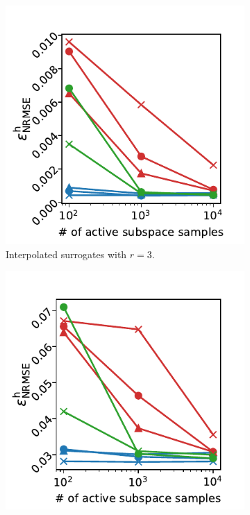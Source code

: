\documentclass[
  a4paper,  %
  twoside,  %
  bibliography=totoc,
  headsepline,
  cleardoublepage=empty,
  parskip=half,
  draft=false
]{scrbook}
\begin{document}
\newpage
\begin{mdframed}[style=style]
\begin{figure}[H]
\begin{subfigure}{.5\textwidth}
  \centering
   \includegraphics[width=\linewidth]{graphics/ishigami_as_3_inter}
	\caption{Interpolated surrogates with $r=3$.}
	\label{fig:ishigami_as_3_inter}
\end{subfigure}
\begin{subfigure}{.5\textwidth}
  \centering
   \includegraphics[width=\linewidth]{graphics/ishigami_as_3}

\end{subfigure}
\end{figure}
\end{mdframed}
\end{document}
